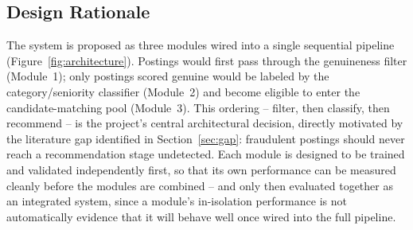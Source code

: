 \documentclass[11pt,a4paper]{article}
\begin{document}
\subsection{Design Rationale}

The system is proposed as three modules wired into a single sequential pipeline
(Figure~\ref{fig:architecture}). Postings would first pass through the genuineness
filter (Module~1); only postings scored genuine would be labeled by the
category/seniority classifier (Module~2) and become eligible to enter the
candidate-matching pool (Module~3). This ordering -- filter, then classify, then
recommend -- is the project's central architectural decision, directly motivated by the
literature gap identified in Section~\ref{sec:gap}: fraudulent postings should never
reach a recommendation stage undetected. Each module is designed to be trained and
validated independently first, so that its own performance can be measured cleanly
before the modules are combined -- and only then evaluated together as an integrated
system, since a module's in-isolation performance is not automatically evidence that it
will behave well once wired into the full pipeline.
\end{document}
